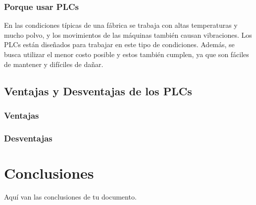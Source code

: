 \documentclass[12pt]{report}
\begin{document}
\subsection{Porque usar PLCs}
En las condiciones típicas de una fábrica se trabaja con altas temperaturas y mucho polvo, y los movimientos de las máquinas también causan vibraciones. Los PLCs están diseñados para trabajar en este tipo de condiciones. Además, se busca utilizar el menor costo posible y estos también cumplen, ya que son fáciles de mantener y difíciles de dañar.

\section{Ventajas y Desventajas de los PLCs}
\subsection{Ventajas}
\subsection{Desventajas}



\chapter{Conclusiones}
Aquí van las conclusiones de tu documento.
\newpage

\printbibliography
\end{document}
